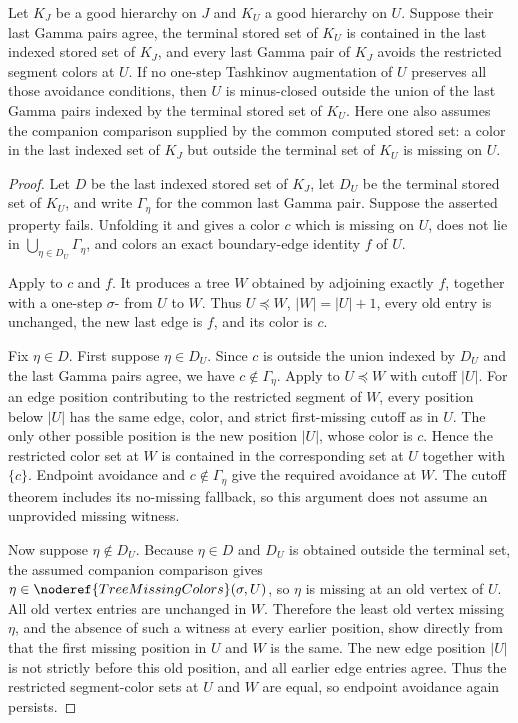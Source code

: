 \begin{helper}
Let $K_J$ be a good hierarchy on $J$ and $K_U$ a good hierarchy on $U$.
Suppose their last Gamma pairs agree, the terminal stored set of $K_U$ is
contained in the last indexed stored set of $K_J$, and every last Gamma
pair of $K_J$ avoids the restricted segment colors at $U$.  If no
one-step Tashkinov augmentation of $U$ preserves all those avoidance
conditions, then $U$ is minus-closed outside the union of the last Gamma
pairs indexed by the terminal stored set of $K_U$.  Here one also assumes
the companion comparison supplied by the common computed stored set: a
color in the last indexed set of $K_J$ but outside the terminal set of
$K_U$ is missing on $U$.
\end{helper}
\begin{proof}
Let $D$ be the last indexed stored set of $K_J$, let $D_U$ be the
terminal stored set of $K_U$, and write $\Gamma_\eta$ for the common last
Gamma pair.  Suppose the asserted
 property fails.  Unfolding it and
 gives a color $c$ which is missing on $U$,
does not lie in $\bigcup_{\eta\in D_U}\Gamma_\eta$, and colors an exact
boundary-edge identity $f$ of $U$.

Apply  to $c$ and $f$.  It
produces a tree $W$ obtained by adjoining exactly $f$, together with a
one-step $\sigma$- from $U$ to $W$.  Thus
$U\preccurlyeq W$, $|W|=|U|+1$, every old entry is unchanged, the new
last edge is $f$, and its color is $c$.

Fix $\eta\in D$.  First suppose $\eta\in D_U$.  Since $c$ is outside the
union indexed by $D_U$ and the last Gamma pairs agree, we have
$c\notin\Gamma_\eta$.  Apply
 to $U\preccurlyeq W$
with cutoff $|U|$.  For an edge position contributing to the restricted
segment of $W$, every position below $|U|$ has the same edge, color, and
strict first-missing cutoff as in $U$.  The only other possible position
is the new position $|U|$, whose color is $c$.  Hence the restricted
color set at $W$ is contained in the corresponding set at $U$ together
with $\{c\}$.  Endpoint avoidance and $c\notin\Gamma_\eta$ give the
required avoidance at $W$.  The cutoff theorem includes its no-missing
fallback, so this argument does not assume an unprovided missing witness.

Now suppose $\eta\notin D_U$.  Because $\eta\in D$ and $D_U$ is obtained
outside the terminal set, the assumed companion comparison gives
$\eta\in\noderef{TreeMissingColors}(\sigma,U)$, so $\eta$ is missing at
an old vertex of $U$.
All old vertex entries are unchanged in $W$.  Therefore the least old
vertex missing $\eta$, and the absence of such a witness at every earlier
position, show directly from  that
the first missing position in $U$ and $W$ is the same.  The new edge
position $|U|$ is not strictly before this old position, and all earlier
edge entries agree.  Thus the restricted segment-color sets at $U$ and
$W$ are equal, so endpoint avoidance again persists.


\end{proof}
